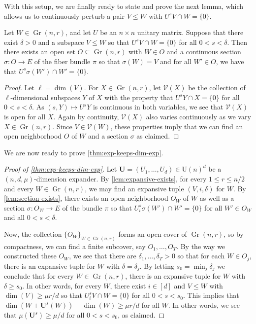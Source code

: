 \documentclass{toc}
\theoremstyle{plain}
\numberwithin{equation}{section}
\theoremstyle{definition}
\DeclareMathOperator\Gr{Gr}
\newcommand{\tuple}[1]{\mathbf{#1}}
\newcommand{\V}{\mathcal{V}}
\newcommand{\vU}{\tuple{U}}
\begin{document}
With this setup, we are finally ready to state and prove the next lemma, which allows us to 
%
continuously perturb
%
a pair $V \leq W$ with $U^s V \cap W = \{0\}$.


\begin{lemma}\label{lem:section-exists}
    Let $W \in \Gr(n,r)$, and let $U$ be an $n\times n$ unitary matrix. Suppose that there exist $\delta>0$ and a subspace $V \leq W$ so that $U^s V \cap W = \{0\}$ for all $0<s<\delta$. Then there exists an open set $O \subseteq \Gr(n,r)$ with $W \in O$ and a continuous section $\sigma:O \to E$ of the fiber bundle $\pi$ so that $\sigma(W)=V$ and for all $W' \in O$, we have that $U^s \sigma(W') \cap W' = \{0\}$. 
\end{lemma}
\begin{proof}
    Let $\ell = \dim (V)$. For $X\in \Gr(n,r)$, let $\V(X)$ be the collection of $\ell$-dimensional subspaces $Y$ of $X$ with the property that $U^s Y \cap X = \{0\}$ for all $0<s<\delta$. As $(s,Y) \mapsto U^s Y$ is continuous in both variables, we see that $\V(X)$ is open for all $X$. Again by continuity, $\V(X)$ also varies continuously as we vary $X \in \Gr(n,r)$. Since $V \in \V(W)$, these properties imply that we can find an open neighborhood $O$ of $W$ and a section $\sigma$ as claimed. 
\end{proof}

We are now ready to prove \cref{thm:exp-keeps-dim-exp}.
\begin{proof}[Proof of \cref{thm:exp-keeps-dim-exp}]
    Let $\vU=(U_1,\dots,U_d)\in\mathrm{U}(n)^d$ be a $(n,d,\mu)$-dimension expander. By \cref{lem:expansive-exists}, for every $1 \leq r \leq n/2$ and every $W \in \Gr(n,r)$, we may find an expansive tuple $(V,i,\delta)$ for $W$. By \cref{lem:section-exists}, there exists an open neighborhood $O_W$ of $W$ as well as a section $\sigma:O_W \to E$ of the bundle $\pi$ so that $U_i^s \sigma(W') \cap W'=\{0\}$ for all $W' \in O_W$ and all $0<s<\delta$.

    Now, the collection $\{O_W\}_{W \in \Gr(n,r)}$ forms an open cover of $\Gr(n,r)$, so by compactness, we can find a finite subcover, say $O_1,\dots,O_T$. By the way we constructed these $O_W$, we see that there are $\delta_1,\dots,\delta_T>0$ so that for each $W \in O_j$, there is an expansive tuple for $W$ with $\delta=\delta_j$. By letting $s_0 = \min_{j} \delta_j$ we conclude that for every $W \in \Gr(n,r)$, there is an expansive tuple for $W$ with $\delta \geq s_0$. In other words, for every $W$, there exist $i \in [d]$ and $V\leq W$ with $\dim (V) \geq \mu r/d$ so that $U_i^s V \cap W=\{0\}$ for all $0 <s <s_0$. This implies that $\dim(W+\vU^s(W))-\dim(W)\geq \mu r/d$ for all $W$. In other words, we see that $\mu(\vU^s)\geq \mu/d$ for all $0<s<s_0$, as claimed.
\end{proof}
\end{document}
